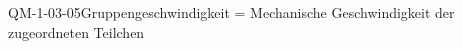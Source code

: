
\begin{CONC}{QM-1-03-05}{Gruppengeschwindigkeit = Mechanische Geschwindigkeit der zugeordneten Teilchen}
\end{CONC}
